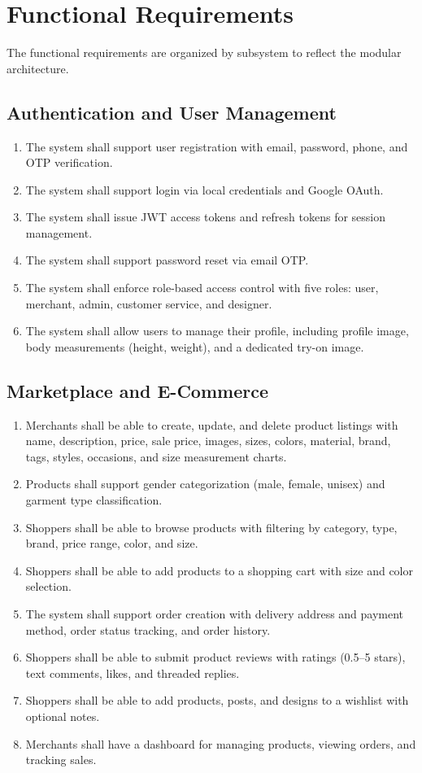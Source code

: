 \section{Functional Requirements}

The functional requirements are organized by subsystem to reflect the modular architecture.

\subsection{Authentication and User Management}
\begin{enumerate}[leftmargin=*, label=FR-\arabic*.]
    \item The system shall support user registration with email, password, phone, and OTP verification.
    \item The system shall support login via local credentials and Google OAuth.
    \item The system shall issue JWT access tokens and refresh tokens for session management.
    \item The system shall support password reset via email OTP.
    \item The system shall enforce role-based access control with five roles: user, merchant, admin, customer service, and designer.
    \item The system shall allow users to manage their profile, including profile image, body measurements (height, weight), and a dedicated try-on image.
\end{enumerate}

\subsection{Marketplace and E-Commerce}
\begin{enumerate}[leftmargin=*, label=FR-\arabic*., resume]
    \item Merchants shall be able to create, update, and delete product listings with name, description, price, sale price, images, sizes, colors, material, brand, tags, styles, occasions, and size measurement charts.
    \item Products shall support gender categorization (male, female, unisex) and garment type classification.
    \item Shoppers shall be able to browse products with filtering by category, type, brand, price range, color, and size.
    \item Shoppers shall be able to add products to a shopping cart with size and color selection.
    \item The system shall support order creation with delivery address and payment method, order status tracking, and order history.
    \item Shoppers shall be able to submit product reviews with ratings (0.5--5 stars), text comments, likes, and threaded replies.
    \item Shoppers shall be able to add products, posts, and designs to a wishlist with optional notes.
    \item Merchants shall have a dashboard for managing products, viewing orders, and tracking sales.
\end{enumerate}

